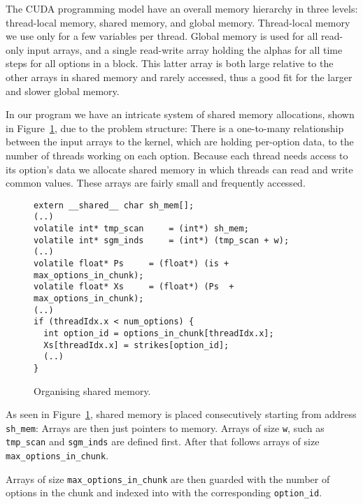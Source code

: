 The CUDA programming model have an overall memory hierarchy
in three levels: thread-local memory, shared memory, and
global memory. Thread-local memory we use only for a few
variables per thread. Global memory is used for all
read-only input arrays, and a single read-write array
holding the alphas for all time steps for all options in a
block. This latter array is both large relative to the other
arrays in shared memory and rarely accessed, thus a good fit
for the larger and slower global memory.

In our program we have an intricate system of shared memory
allocations, shown in Figure~\ref{fig:shmem}, due to the
problem structure: There is a one-to-many relationship
between the input arrays to the kernel, which are holding
per-option data, to the number of threads working on each
option. Because each thread needs access to its option's data
we allocate shared memory in which threads can read and write
common values. These arrays are fairly small and
frequently accessed.
%
\begin{figure}[bt]
\begin{center}
\begin{lstlisting}
extern __shared__ char sh_mem[];
(..)
volatile int* tmp_scan     = (int*) sh_mem;
volatile int* sgm_inds     = (int*) (tmp_scan + w);
(..)
volatile float* Ps     = (float*) (is + max_options_in_chunk);
volatile float* Xs     = (float*) (Ps  + max_options_in_chunk);
(..)
if (threadIdx.x < num_options) {
  int option_id = options_in_chunk[threadIdx.x];
  Xs[threadIdx.x] = strikes[option_id];
  (..)
}
\end{lstlisting}
\caption{Organising shared memory.}
\label{fig:shmem}
\end{center}
\end{figure}
%

As seen in Figure~\ref{fig:shmem}, shared memory is placed 
consecutively starting from address \texttt{sh\_mem}: Arrays are then just pointers
to memory. Arrays of size \texttt{w}, such as \texttt{tmp\_scan} and \texttt{sgm\_inds} are defined
first. After that follows arrays of size \texttt{max\_options\_in\_chunk}.

Arrays of size \texttt{max\_options\_in\_chunk} are then guarded with the
number of options in the chunk and indexed into with the corresponding
\texttt{option\_id}.

